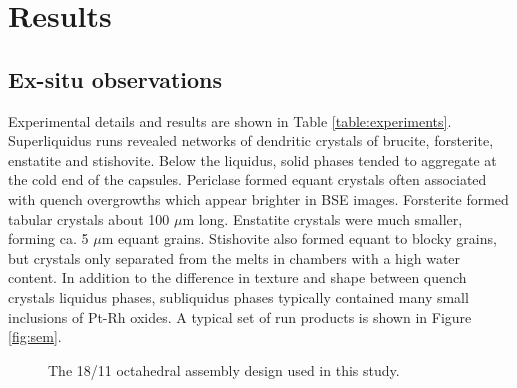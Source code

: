 \documentclass[review]{elsarticle}
\begin{document}
\clearpage
\section{Results}
\subsection{Ex-situ observations}
Experimental details and results are shown in Table \ref{table:experiments}. Superliquidus runs revealed networks of dendritic crystals of brucite, forsterite, enstatite and stishovite. Below the liquidus, solid phases tended to aggregate at the cold end of the capsules. Periclase formed equant crystals often associated with quench overgrowths which appear brighter in BSE images. Forsterite formed tabular crystals about 100 $\mu$m long. Enstatite crystals were much smaller, forming ca. 5 $\mu$m equant grains. Stishovite also formed equant to blocky grains, but crystals only separated from the melts in chambers with a high water content. In addition to the difference in texture and shape between quench crystals liquidus phases, subliquidus phases typically contained many small inclusions of Pt-Rh oxides. A typical set of run products is shown in Figure \ref{fig:sem}.

\begin{figure}[h!]
  \centering
  \caption{The 18/11 octahedral assembly design used in this study.}
  \label{fig:assembly}
\end{figure}
\end{document}
